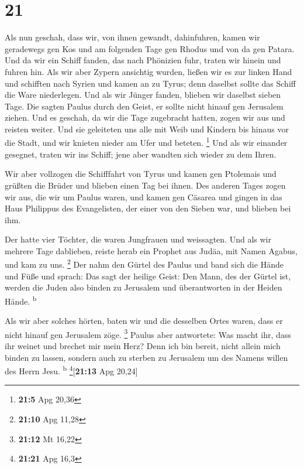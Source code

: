 \hypertarget{section-20}{%
\section{21}\label{section-20}}

 Als nun geschah, dass wir, von ihnen gewandt,
dahinfuhren, kamen wir geradewegs gen Kos und am folgenden Tage gen
Rhodus und von da gen Patara.  Und da wir ein Schiff
fanden, das nach Phönizien fuhr, traten wir hinein und fuhren hin.
 Als wir aber Zypern ansichtig wurden, ließen wir es zur
linken Hand und schifften nach Syrien und kamen an zu Tyrus; denn
daselbst sollte das Schiff die Ware niederlegen.  Und als
wir Jünger fanden, blieben wir daselbst sieben Tage. Die sagten Paulus
durch den Geist, er sollte nicht hinauf gen Jerusalem ziehen.
 Und es geschah, da wir die Tage zugebracht hatten, zogen
wir aus und reisten weiter. Und sie geleiteten uns alle mit Weib und
Kindern bis hinaus vor die Stadt, und wir knieten nieder am Ufer und
beteten. \footnote{\textbf{21:5} Apg 20,36}  Und als wir
einander gesegnet, traten wir ins Schiff; jene aber wandten sich wieder
zu dem Ihren.

 Wir aber vollzogen die Schifffahrt von Tyrus und kamen
gen Ptolemais und grüßten die Brüder und blieben einen Tag bei ihnen.
 Des anderen Tages zogen wir aus, die wir um Paulus waren,
und kamen gen Cäsarea und gingen in das Haus Philippus des Evangelisten,
der einer von den Sieben war, und blieben bei ihm.

 Der hatte vier Töchter, die waren Jungfrauen und
weissagten.  Und als wir mehrere Tage dablieben, reiste
herab ein Prophet aus Judäa, mit Namen Agabus, und kam zu uns.
\footnote{\textbf{21:10} Apg 11,28}  Der nahm den Gürtel
des Paulus und band sich die Hände und Füße und sprach: Das sagt der
heilige Geist: Den Mann, des der Gürtel ist, werden die Juden also
binden zu Jerusalem und überantworten in der Heiden Hände.
\textsuperscript{b}

 Als wir aber solches hörten, baten wir und die desselben
Ortes waren, dass er nicht hinauf gen Jerusalem zöge. \footnote{\textbf{21:12}
  Mt 16,22}  Paulus aber antwortete: Was macht ihr, dass
ihr weinet und brechet mir mein Herz? Denn ich bin bereit, nicht allein
mich binden zu lassen, sondern auch zu sterben zu Jerusalem um des
Namens willen des Herrn Jesu. \textsuperscript{b}
\footnote{\textbf{21:21} Apg 16,3}{[}\textbf{21:13} Apg 20,24{]}

